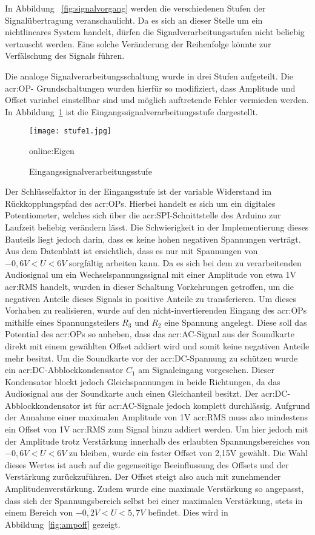 In Abbildung ~\ref{fig:signalvorgang} werden die verschiedenen Stufen der Signalübertragung veranschaulicht. Da es sich an dieser Stelle um ein nichtlineares System handelt, dürfen die Signalverarbeitungsstufen nicht beliebig vertauscht werden. Eine solche Veränderung der Reihenfolge könnte zur Verfälschung des Signals führen. 

Die analoge Signalverarbeitungsschaltung wurde in drei Stufen aufgeteilt. Die \gls{acr:OP}- Grundschaltungen wurden hierfür so modifiziert, dass Amplitude und Offset variabel einstellbar sind und möglich auftretende Fehler vermieden werden. In Abbildung~\ref{fig:stufe1} ist die Eingangssignalverarbeitungsstufe dargestellt. 

\begin{figure}[H]
	\centering
	\texttt{[image: stufe1.jpg]}
	\caption[Eingangssignalverarbeitungsstufe]{Eingangssignalverarbeitungsstufe} \gls{online:Eigen}
	\label{fig:stufe1}
\end{figure}

Der Schlüsselfaktor in der Eingangsstufe ist der variable Widerstand im Rückkopplungspfad des \gls{acr:OP}s. Hierbei handelt es sich um ein digitales Potentiometer, welches sich über die \gls{acr:SPI}-Schnittstelle des Arduino zur Laufzeit beliebig verändern lässt. Die Schwierigkeit in der Implementierung dieses Bauteils liegt jedoch darin, dass es keine hohen negativen Spannungen verträgt. Aus dem Datenblatt ist ersichtlich, dass es nur mit Spannungen von $-0,6V<U<6V$ sorgfältig arbeiten kann. Da es sich bei dem zu verarbeitenden Audiosignal um ein Wechselspannungssignal mit einer Amplitude von etwa 1V \gls{acr:RMS} handelt, wurden in dieser Schaltung Vorkehrungen getroffen, um die negativen Anteile dieses Signals in positive Anteile zu transferieren. Um dieses Vorhaben zu realisieren, wurde auf den nicht-invertierenden Eingang des \gls{acr:OP}s mithilfe eines Spannungsteilers $R_{3}$ und $R_{2}$ eine Spannung angelegt. Diese soll das Potential des \gls{acr:OP}s so anheben, dass das \gls{acr:AC}-Signal aus der Soundkarte direkt mit einem gewählten Offset addiert wird und somit keine negativen Anteile mehr besitzt. Um die Soundkarte vor der \gls{acr:DC}-Spannung zu schützen wurde ein \gls{acr:DC}-Abblockkondensator $C_{1}$ am Signaleingang vorgesehen. Dieser Kondensator blockt jedoch Gleichspannungen in beide Richtungen, da das Audiosignal aus der Soundkarte auch einen Gleichanteil besitzt. Der \gls{acr:DC}-Abblockkondensator ist für \gls{acr:AC}-Signale jedoch komplett durchlässig. Aufgrund der Annahme einer maximalen Amplitude von 1V \gls{acr:RMS} muss also mindestens ein Offset von 1V \gls{acr:RMS} zum Signal hinzu addiert werden. Um hier jedoch mit der Amplitude trotz Verstärkung innerhalb des erlaubten Spannungsbereiches von $-0,6V<U<6V$ zu bleiben, wurde ein fester Offset von 2,15V gewählt. Die Wahl dieses Wertes ist auch auf die gegenseitige Beeinflussung des Offsets und der Verstärkung zurückzuführen. Der Offset steigt also auch mit zunehmender Amplitudenverstärkung. Zudem wurde eine maximale Verstärkung so angepasst, dass sich der Spannungsbereich selbst bei einer maximalen Verstärkung, stets in einem Bereich von $-0,2V<U<5,7V$ befindet. Dies wird in Abbildung~\ref{fig:ampoff} gezeigt.

